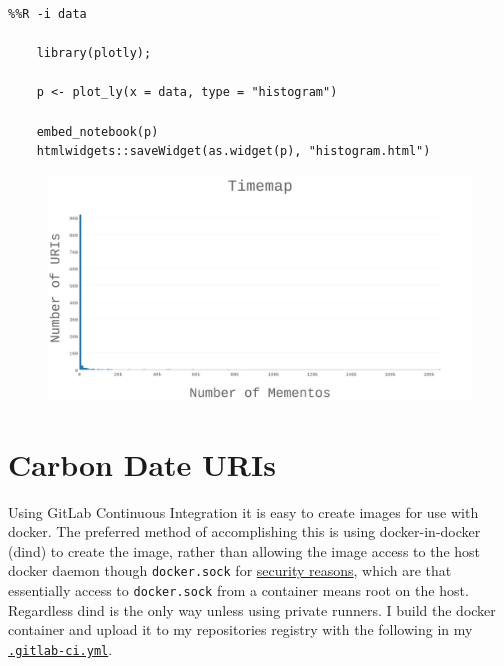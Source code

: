 \documentclass[12pt, a4paper]{article}
\newcommand{\code}[1]{\texttt{#1}}
\begin{document}
\begin{minipage}{\linewidth} %
\vspace{2em}
\begin{verbatim}
%%R -i data

    library(plotly);

    p <- plot_ly(x = data, type = "histogram")

    embed_notebook(p)
    htmlwidgets::saveWidget(as.widget(p), "histogram.html")
\end{verbatim}
\vspace{2em}
\end{minipage}

\begin{figure}[h]
    \centering
    \href{http://datenstrom.gitlab.io/cs532-s17/notebooks/histogram.html}{
    \includegraphics[width=\textwidth]{dia/timemap.png}
    }
\end{figure}

%
%
\newpage
\section{Carbon Date URIs}
Using GitLab Continuous Integration it is easy to create images for use
with docker. The preferred method of accomplishing this is using
docker-in-docker (dind) to create the image, rather than allowing the image
access to the host docker daemon though \code{docker.sock} for
\href{https://www.youtube.com/watch?v=CB9Aa6QeRaI&feature=youtu.be}{security reasons},
which are that essentially access to \code{docker.sock} from a
container means root on the host. Regardless dind is the only way
unless using private runners. I build the docker container and
upload it to my repositories registry with the following in my
\href{https://gitlab.com/datenstrom/cs532-s17/blob/master/.gitlab-ci.yml}{\code{.gitlab-ci.yml}}.
\end{document}
